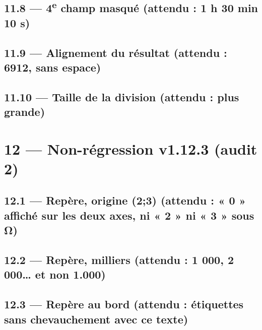 \documentclass[12pt]{extarticle}
\begin{document}

\subsection*{11.8 — 4\textsuperscript{e} champ masqué (attendu : 1 h 30 min 10 s)}


\subsection*{11.9 — Alignement du résultat (attendu : 6912, sans espace)}


\subsection*{11.10 — Taille de la division (attendu : plus grande)}

\division[dividende=1234, diviseur=56, solution, taille=large]

\section*{12 — Non-régression v1.12.3 (audit 2)}

\subsection*{12.1 — Repère, origine (2;3) (attendu : « 0 » affiché sur les deux axes, ni « 2 » ni « 3 » sous Ω)}

\reperegradue[bg={(-1,-1)}, hd={(6,5)}, origine={(2,3)}]

\subsection*{12.2 — Repère, milliers (attendu : 1 000, 2 000… et non 1.000)}

\reperegradue[bg={(0,0)}, hd={(5000,2000)}, pasx=1000, pasy=1000, grille=1000]

\subsection*{12.3 — Repère au bord (attendu : étiquettes sans chevauchement avec ce texte)}
\end{document}
